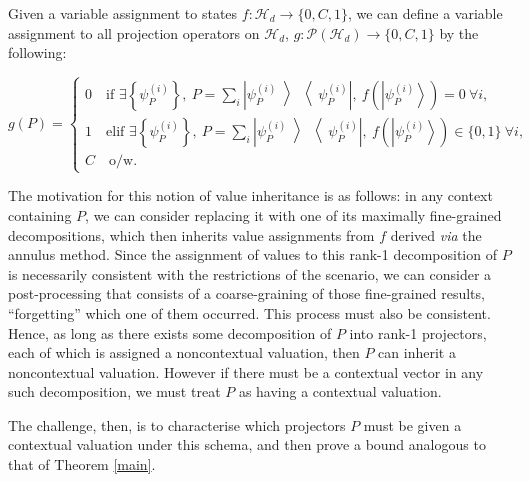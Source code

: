 \documentclass{amsart}
\theoremstyle{definition}
\newcommand{\ket}[1]{{\left\vert{#1}\right\rangle}}
\newcommand{\ketbra}[1]{{\left\vert {#1}\middle\rangle\middle\langle{#1}\right\vert}}
\begin{document}
Given a variable assignment to states $f:\mathcal{H}_d\rightarrow \{0,C,1\}$, we can define a variable assignment to all projection operators on $\mathcal{H}_d$, $g:\mathcal{P}(\mathcal{H}_d)\rightarrow \{0,C,1\}$ by the following:

\begin{equation}
g(P)=\begin{cases}
0\quad \mbox{if } \exists \left\{\psi_P^{(i)}\right\}, \>P=\sum_i \ketbra{\psi_P^{(i)}}, \>f\left(\ket{\psi_P^{(i)}}\right)=0\>\forall i,\\
1\quad \mbox{elif } \exists \left\{\psi_P^{(i)}\right\}, \>P=\sum_i \ketbra{\psi_P^{(i)}}, \>f\left(\ket{\psi_P^{(i)}}\right)\in\{0,1\}\>\forall i, \\
C\quad \mbox{o/w.}
\end{cases}
\end{equation}

The motivation for this notion of value inheritance is as follows: in any context containing $P$, we can consider replacing it with one of its maximally fine-grained decompositions, which then inherits value assignments from $f$ derived \emph{via} the annulus method. Since the assignment of values to this rank-1 decomposition of $P$ is necessarily consistent with the restrictions of the scenario, we can consider a post-processing that consists of a coarse-graining of those fine-grained results, ``forgetting'' which one of them occurred. This process must also be consistent. Hence, as long as there exists some decomposition of $P$ into rank-1 projectors, each of which is assigned a noncontextual valuation, then $P$ can inherit a noncontextual valuation. However if there must be a contextual vector in any such decomposition, we must treat $P$ as having a contextual valuation.

The challenge, then, is to characterise which projectors $P$ must be given a contextual valuation under this schema, and then prove a bound analogous to that of Theorem \ref{main}.
\end{document}
